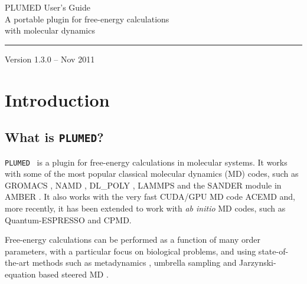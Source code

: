 \documentclass[12pt,fleqn]{report}
\newcommand{\plumed}{{\tt PLUMED}}
\begin{document}
\begin{titlepage}
\vspace{4cm}
\begin{flushleft}
{
 {    \Huge{PLUMED User's Guide}} \\ \vspace{.5cm}
 {   \selectfont \Large{A portable plugin for free-energy calculations \\ with  molecular dynamics}}
}
\rule{12cm}{4pt}
\end{flushleft}
\vspace{10cm}


\begin{flushright}
    \large{Version 1.3.0 -- Nov 2011}
\end{flushright}



\end{titlepage}

\tableofcontents

\chapter{Introduction}
\label{ch.introduction}

\section{What is \plumed?} 

 \plumed\cite{plumed} \ is a plugin for free-energy calculations in molecular
systems.  It works with some of the most popular classical molecular dynamics (MD) codes,
such as GROMACS \cite{Hess:2008p11450}, NAMD \cite{NAMD}, DL\_POLY \cite{dlpoly} , LAMMPS \cite{lammps}
and the  SANDER module in AMBER \cite{Case:2006p16366}.
It also works with the very fast CUDA/GPU MD code ACEMD \cite{acemd} and,
more recently, it has been extended to work with \emph{ab initio} MD codes,
such as Quantum-ESPRESSO \cite{giannozzi09jpcm} and CPMD.

Free-energy calculations can be performed as a function of
many order parameters, with a particular focus on biological problems, and using
state-of-the-art methods such as metadynamics \cite{metad}, umbrella sampling \cite{torrie-valleau,wham1,wham2} and
Jarzynski-equation based steered MD \cite{jarzynski,Crooks98}.  
\end{document}

